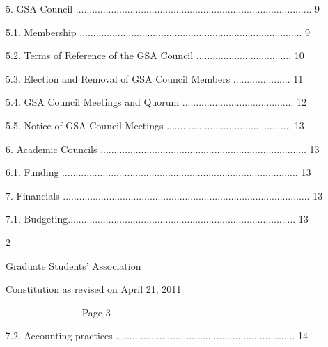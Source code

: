  5.    GSA Council ....................................................................................... 9  



     5.1.    Membership .................................................................................. 9  



     5.2.     Terms of Reference of the GSA Council ................................... 10  



     5.3.     Election and Removal of GSA Council Members ..................... 11  



     5.4.     GSA Council Meetings and Quorum ......................................... 12  



     5.5.    Notice of GSA Council Meetings .............................................. 13  



 6.    Academic Councils ............................................................................ 13  



     6.1.    Funding ....................................................................................... 13  



 7.    Financials ........................................................................................... 13  



     7.1.    Budgeting.................................................................................... 13  



                                                                  

                                                               2  



                                            Graduate Students’ Association  



                                      Constitution as revised on April 21, 2011  


----------------------- Page 3-----------------------

   7.2.        Accounting practices .................................................................. 14  




